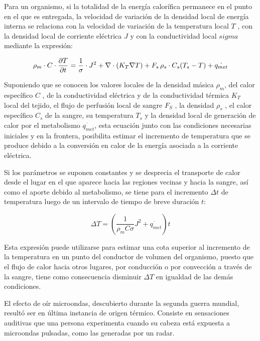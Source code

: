 Para un organismo, si la totalidad de la energía calorífica permanece en el punto en el que es entregada, la velocidad de variación de la densidad local de energía interna se relaciona con la velocidad de variación de la temperatura local $T$ , con la densidad local de corriente eléctrica $J$ y con la conductividad local $sigma$ mediante la expresión:

\begin{equation}
\rho_{m}\cdot C \cdot \dfrac{\partial T}{\partial t} =  \dfrac{1}{\sigma} \cdot J^{2} + \nabla \cdot (K_{T}\nabla T)+ F_{s} \, \rho_{s} \cdot C_{s} (T_{s}-T)+ \dot{q_{met}}
\end{equation}

Suponiendo que se conocen los valores locales de la densidad másica $\rho_{m}$, del calor específico $C$ , de la conductividad eléctrica y de la conductividad térmica $K_{T}$ local del tejido, el flujo de perfusión local de sangre $F_{S}$ , la densidad $\rho_{s}$ , el calor específico $C_{s}$ de la sangre, su temperatura $T_{s}$ y la densidad local de generación de calor por el metabolismo $\dot{q_{met}}$, esta ecuación junto con las condiciones necesarias iniciales y en la frontera, posibilita estimar el incremento de temperatura que se produce debido a la conversión en calor de la energía asociada a la corriente eléctrica.

Si los parámetros se suponen constantes y se desprecia el transporte de calor desde el lugar en el que aparece hacia las regiones vecinas y hacia la sangre, así como el aporte debido al metabolismo, se tiene para el incremento $\Delta t$ de temperatura luego de un intervalo de tiempo de breve duración $t$:

\begin{equation}
\Delta T = \left(\dfrac{1}{\rho_{m}C\sigma} J^{2} +  \dot{q_{met}} \right) t
\end{equation}

Esta expresión puede utilizarse para estimar una cota superior al incremento de la temperatura en un punto del conductor de volumen del organismo, puesto que el flujo de calor hacia otros lugares, por conducción o por convección a través de la sangre, tiene como consecuencia disminuir $\Delta T$ en igualdad de las demás condiciones.

El efecto de oír microondas, descubierto durante la segunda guerra mundial, resultó ser en última instancia de origen térmico. Consiste en sensaciones auditivas que una persona experimenta cuando su cabeza está expuesta a microondas pulsadas, como las generadas por un radar.

